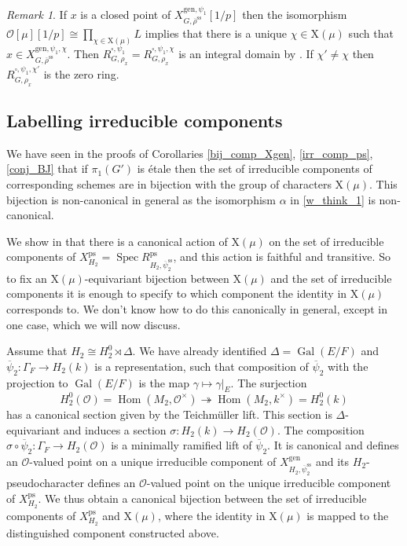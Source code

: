 \documentclass{amsart}
\theoremstyle{definition}
\theoremstyle{remark}
\newtheorem{remar}[prop]{Remark}
\DeclareMathOperator{\Hom}{Hom}
\DeclareMathOperator{\Gal}{Gal}
\DeclareMathOperator{\Spec}{Spec}
\newcommand{\OO}{\mathcal O}
\newcommand{\rhobar}{\overline{\rho}}
\newcommand{\ps}{\mathrm{ps}}
\newcommand{\gen}{\mathrm{gen}}
\newcommand{\rhobarss}{\rhobar^{\mathrm{ss}}}
\newcommand{\psibar}{\overline{\psi}}
\newcommand{\psibarss}{\psibar^{\mathrm {ss}}}
\begin{document}
\begin{remar} If $x$ is a closed point of $X^{\gen, \psi_1}_{G,\rhobarss}[1/p]$ 
then the isomorphism $\OO[\mu][1/p]\cong \prod_{\chi\in \mathrm X(\mu)} L$
implies that there is a unique $\chi\in \mathrm X(\mu)$ such that 
$x\in X^{\gen, \psi_1,\chi}_{G,\rhobarss}$. Then $R^{\square,\psi_1}_{G, \rho_x}= R^{\square, \psi_1, \chi}_{G, \rho_x}$ is an integral domain 
by . If $\chi'\neq \chi$ then $R^{\square, \psi_1, \chi'}_{G, \rho_x}$ is the zero ring. 
\end{remar}


\subsection{Labelling irreducible components}\label{label} 
We have seen in the proofs of Corollaries \ref{bij_comp_Xgen},
\ref{irr_comp_ps}, \ref{conj_BJ} that if $\pi_1(G')$ is \'etale then the set of irreducible components of corresponding schemes are in bijection with the group of characters 
$\mathrm{X}(\mu)$. This bijection is non-canonical in general as the isomorphism 
$\alpha$ in \eqref{w_think_1} is non-canonical.

We show in \cite[Section 7.4]{defT} that there is a canonical action of $\mathrm X(\mu)$ 
on the set of irreducible components of $X^{\ps}_{H_2}= \Spec R^{\ps}_{H_2, \psibarss_2}$, and this action is faithful and transitive. So to fix an $\mathrm X(\mu)$-equivariant bijection 
between $\mathrm X(\mu)$ and the set of irreducible components 
it is enough to specify to which component the identity in $\mathrm X(\mu)$ 
corresponds to. We don't know how to do this canonically in general, 
except in one case, which we will now discuss. 

Assume that $H_2\cong H_2^0 \rtimes \Delta$. We have already identified 
$\Delta=\Gal(E/F)$ and $\psibar_2: \Gamma_F \rightarrow H_2(k)$ is a representation, such that composition of $\psibar_2$ with the projection
to $\Gal(E/F)$ is the map $\gamma \mapsto \gamma|_E$. The surjection 
$$H_2^0(\OO)=\Hom(M_2, \OO^{\times})\twoheadrightarrow \Hom(M_2, k^{\times})=
H_2^0(k)$$
has a canonical section given by the Teichm\"uller lift. This section is 
$\Delta$-equivariant and induces a section $\sigma: H_2(k)\rightarrow H_2(\OO)$.
The composition 
$\sigma\circ \psibar_2: \Gamma_F \rightarrow H_2(\OO)$ is a minimally ramified 
lift of $\psibar_2$. It is canonical and defines an $\OO$-valued point on  a unique  irreducible 
component of $X^{\gen}_{H_2,\psibarss_2}$ and its $H_2$-pseudocharacter defines 
an $\OO$-valued point on the unique irreducible component of 
$X^{\ps}_{H_2}$. We thus obtain a canonical bijection between the set of irreducible components
of $X^{\ps}_{H_2}$ and $\mathrm X(\mu)$, where the identity in $\mathrm X(\mu)$ is mapped to the 
distinguished component constructed above.
\end{document}

